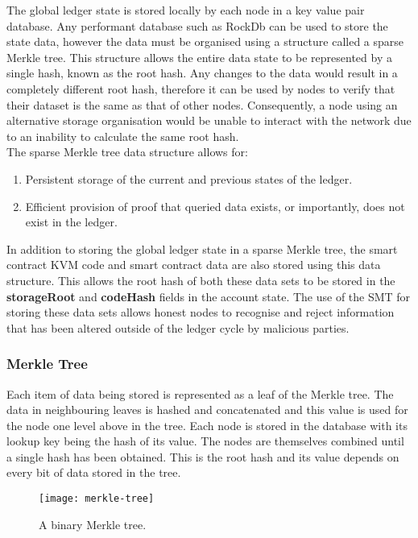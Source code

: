 
The global ledger state is stored locally by each node in a key value pair database. Any performant database such as RockDb can be used to store the state data, however the data must be organised using a structure called a sparse Merkle tree. This structure allows the entire data state to be represented by a single hash, known as the root hash. Any changes to the data would result in a completely different root hash, therefore it can be used by nodes to verify that their dataset is the same as that of other nodes. Consequently, a node using an alternative storage organisation would be unable to interact with the network due to an inability to calculate the same root hash.\\

The sparse Merkle tree data structure allows for:

\begin{enumerate}
\item Persistent storage of the current and previous states of the ledger.
\item Efficient provision of proof that queried data exists, or importantly, does not exist in the ledger.\end{enumerate}

In addition to storing the global ledger state in a sparse Merkle tree, the smart contract KVM code and smart contract data are also stored using this data structure. This allows the root hash of both these data sets to be stored in the \textbf{storageRoot} and \textbf{codeHash} fields in the account state.  The use of the SMT for storing these data sets allows honest nodes to recognise and reject information that has been altered outside of the ledger cycle by malicious parties. \\

\subsubsection{Merkle Tree}

Each item of data being stored is represented as a leaf of the Merkle tree. The data in neighbouring leaves is hashed and concatenated and this value is used for the node one level above in the tree. Each node is stored in the database with its lookup key being the hash of its value. The nodes are themselves combined until a single hash has been obtained. This is the root hash and its value depends on every bit of data stored in the tree.\\

\begin{figure}[h]
  \centering
  \captionsetup{format=hang, font=footnotesize}
  \caption{A binary Merkle tree.}
\texttt{[image: merkle-tree]}
\end{figure}

